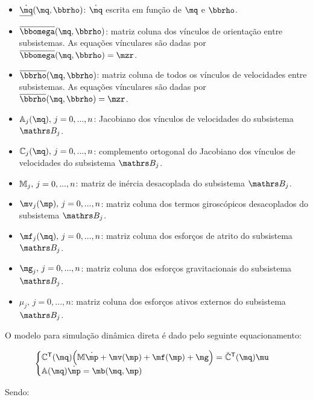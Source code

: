 \documentclass[a4paper,11pt,brazil,fleqn]{article}
\begin{document}
\begin{itemize}
\item $\underline{\dot{\mq}}(\mq,\mrho)$: $\dot{\mq}$ escrita em fun\c{c}\~ao de $\mq$ e $\mrho$.
\item $\overline{\momega}(\mq,\mrho)$: matriz coluna dos v\'inculos de orienta\c{c}\~ao entre subsistemas. As equa\c{c}\~oes v\'inculares s\~ao dadas por $\overline{\momega}(\mq,\mrho) = \mzr $.
\item $\overline{\mrho}(\mq,\mrho)$: matriz coluna de todos os v\'inculos de velocidades entre subsistemas. As equa\c{c}\~oes v\'inculares s\~ao dadas por $\overline{\mrho}(\mq,\mrho) = \mzr $.
\item $\mA_j(\mq), \,j=0, ..., n$: Jacobiano dos v\'inculos de velocidades do subsistema $\ssB_j$.
\item $\mC_j(\mq), \,j=0, ..., n$: complemento ortogonal do Jacobiano dos v\'inculos de velocidades do subsistema $\ssB_j$.
\item $\mathbb{M}_j, \,j=0, ..., n$: matriz de in\'ercia desacoplada do subsistema $\ssB_j$.
\item $\mv_j(\mp), \,j=0, ..., n$: matriz coluna dos termos girosc\'opicos desacoplados do subsistema $\ssB_j$.
\item $\mf_j(\mq), \,j=0, ..., n$: matriz coluna dos esfor\c{c}os de atrito do subsistema $\ssB_j$.
\item $\mg_j, \,j=0, ..., n$: matriz coluna dos esfor\c{c}os gravitacionais do subsistema $\ssB_j$.
\item $\mu_j, \,j=0, ..., n$: matriz coluna dos esfor\c{c}os ativos externos do subsistema $\ssB_j$.
\end{itemize}

O modelo para simula\c{c}\~ao din\^amica direta \'e dado pelo seguinte equacionamento:

\begin{equation} \label{eq:DinamicaDireta2}
\begin{cases}
\mC^\msT(\mq) \Big( \mM \dot{\mp} + \mv(\mp) + \mf(\mp) + \mg \Big) = \breve{\mC}^\msT(\mq) \mu \\
\mA(\mq) \dot{\mp} = \mb(\mq,\mp)
\end{cases}
\end{equation}

Sendo:
\end{document}
